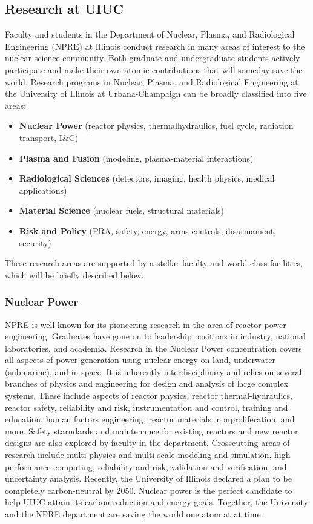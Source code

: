 \subsection{Research at UIUC}
Faculty and students in the Department of Nuclear, Plasma, and Radiological Engineering (NPRE) at Illinois conduct research in many areas of interest to the nuclear science community. Both graduate and undergraduate  students actively participate and make their own atomic contributions that will someday save the world.
Research programs in Nuclear, Plasma, and Radiological Engineering at the University of Illinois at Urbana-Champaign can be
broadly classified into five areas:
\begin{itemize}
        \item \textbf{Nuclear Power} (reactor physics, thermalhydraulics, fuel cycle, radiation transport, I\&C)
        \item \textbf{Plasma and Fusion} (modeling, plasma-material interactions)
        \item \textbf{Radiological Sciences} (detectors, imaging, health physics, medical applications)
        \item \textbf{Material Science} (nuclear fuels, structural materials)
        \item \textbf{Risk and Policy} (PRA, safety, energy, arms controls, disarmament, security)
\end{itemize}

These research areas are supported by a stellar faculty and world-class facilities, which 
will be briefly described below.

\subsubsection{Nuclear Power}
NPRE is well known for its pioneering research in the area of reactor power engineering. Graduates have gone on to leadership positions in industry, national laboratories, and academia. Research in the Nuclear Power concentration covers all aspects of power generation using nuclear energy on land, underwater (submarine), and in space. It is inherently interdisciplinary and relies on several branches of physics and engineering for design and analysis of large complex systems. These include aspects of reactor physics, reactor thermal-hydraulics, reactor safety, reliability and risk, instrumentation and control, training and education, human factors engineering, reactor materials, nonproliferation, and more. Safety starndards and maintenance for existing reactors and new reactor designs are also explored by faculty in the department. Crosscutting areas of research include multi-physics and multi-scale modeling and simulation, high performance computing, reliability and risk, validation and verification, and uncertainty analysis. Recently, the University of Illinois declared a plan to be completely carbon-neutral by 2050. Nuclear power is the perfect candidate to help UIUC attain its carbon reduction and energy goals. Together, the University and the NPRE department are saving the world one atom at at time.

